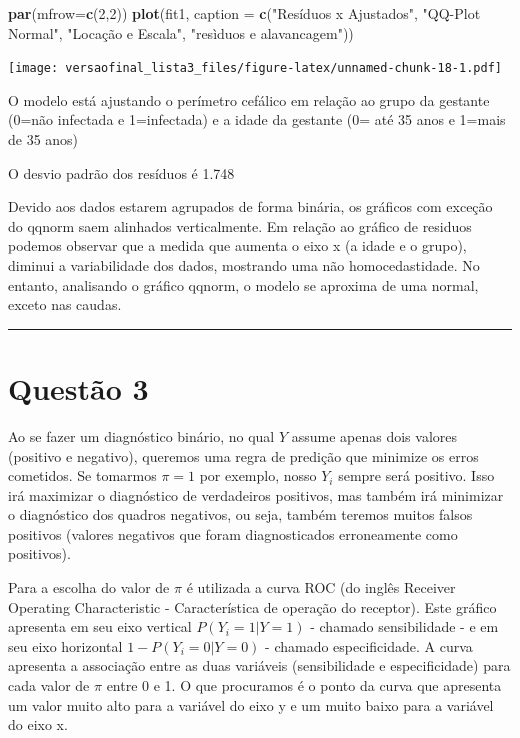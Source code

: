 \documentclass[11pt,]{article}
\newenvironment{Shaded}{\begin{snugshade}}{\end{snugshade}}
\newcommand{\KeywordTok}[1]{\textcolor[rgb]{0.13,0.29,0.53}{\textbf{{#1}}}}
\newcommand{\DataTypeTok}[1]{\textcolor[rgb]{0.13,0.29,0.53}{{#1}}}
\newcommand{\DecValTok}[1]{\textcolor[rgb]{0.00,0.00,0.81}{{#1}}}
\newcommand{\StringTok}[1]{\textcolor[rgb]{0.31,0.60,0.02}{{#1}}}
\newcommand{\NormalTok}[1]{{#1}}
\begin{document}
\begin{Shaded}
\begin{Highlighting}[]
\KeywordTok{par}\NormalTok{(}\DataTypeTok{mfrow=}\KeywordTok{c}\NormalTok{(}\DecValTok{2}\NormalTok{,}\DecValTok{2}\NormalTok{))}
\KeywordTok{plot}\NormalTok{(fit1, }\DataTypeTok{caption =} \KeywordTok{c}\NormalTok{(}\StringTok{"Resíduos x Ajustados"}\NormalTok{, }\StringTok{"QQ-Plot Normal"}\NormalTok{,}
                       \StringTok{"Locação e Escala"}\NormalTok{, }\StringTok{"resìduos e alavancagem"}\NormalTok{))}
\end{Highlighting}
\end{Shaded}

\texttt{[image: versaofinal\_lista3\_files/figure-latex/unnamed-chunk-18-1.pdf]}

O modelo está ajustando o perímetro cefálico em relação ao grupo da
gestante (0=não infectada e 1=infectada) e a idade da gestante (0= até
35 anos e 1=mais de 35 anos)

O desvio padrão dos resíduos é 1.748

Devido aos dados estarem agrupados de forma binária, os gráficos com
exceção do qqnorm saem alinhados verticalmente. Em relação ao gráfico de
residuos podemos observar que a medida que aumenta o eixo x (a idade e o
grupo), diminui a variabilidade dos dados, mostrando uma não
homocedastidade. No entanto, analisando o gráfico qqnorm, o modelo se
aproxima de uma normal, exceto nas caudas.

\begin{center}\rule{0.5\linewidth}{\linethickness}\end{center}

\section{Questão 3}\label{questao-3}

Ao se fazer um diagnóstico binário, no qual \(Y\) assume apenas dois
valores (positivo e negativo), queremos uma regra de predição que
minimize os erros cometidos. Se tomarmos \(\pi =1\) por exemplo, nosso
\(Y_{i}\) sempre será positivo. Isso irá maximizar o diagnóstico de
verdadeiros positivos, mas também irá minimizar o diagnóstico dos
quadros negativos, ou seja, também teremos muitos falsos positivos
(valores negativos que foram diagnosticados erroneamente como
positivos).

Para a escolha do valor de \(\pi\) é utilizada a curva ROC (do inglês
Receiver Operating Characteristic - Característica de operação do
receptor). Este gráfico apresenta em seu eixo vertical
\(P(Y_{i}=1|Y=1)\) - chamado sensibilidade - e em seu eixo horizontal
\(1-P(Y_{i}=0|Y=0)\) - chamado especificidade. A curva apresenta a
associação entre as duas variáveis (sensibilidade e especificidade) para
cada valor de \(\pi\) entre 0 e 1. O que procuramos é o ponto da curva
que apresenta um valor muito alto para a variável do eixo y e um muito
baixo para a variável do eixo x.
\end{document}
